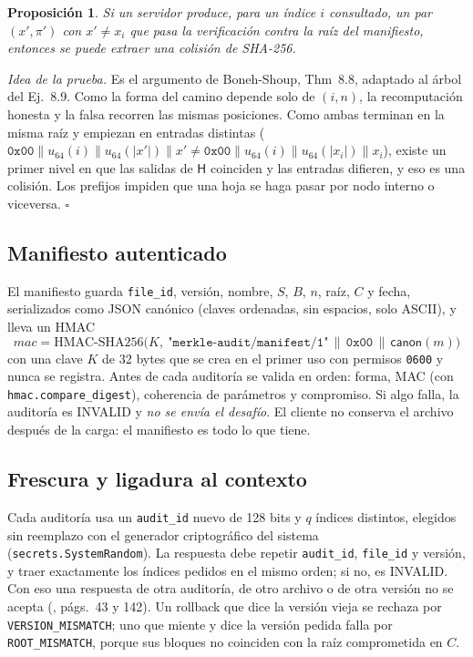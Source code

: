 \documentclass[11pt,a4paper]{article}
\newcommand{\code}[1]{\texttt{#1}}
\newcommand{\cause}[1]{\texttt{\small #1}}
\newcommand{\Hash}{\mathsf{H}}
\newtheorem{proposicion}{Proposición}
\begin{document}
\begin{proposicion}
Si un servidor produce, para un índice $i$ consultado, un par $(x',\pi')$ con $x'\ne x_i$ que pasa
la verificación contra la raíz del manifiesto, entonces se puede extraer una colisión de SHA-256.
\end{proposicion}
\noindent\emph{Idea de la prueba.} Es el argumento de Boneh-Shoup, Thm~8.8, adaptado al árbol del
Ej.~8.9. Como la forma del camino depende solo de $(i,n)$, la recomputación honesta y la falsa
recorren las mismas posiciones. Como ambas terminan en la misma raíz y empiezan en entradas
distintas ($\code{0x00}\|u_{64}(i)\|u_{64}(|x'|)\|x' \ne \code{0x00}\|u_{64}(i)\|u_{64}(|x_i|)\|x_i$),
existe un primer nivel en que las salidas de $\Hash$ coinciden y las entradas difieren, y eso es una
colisión. Los prefijos impiden que una hoja se haga pasar por nodo interno o viceversa. \hfill$\square$

\subsection{Manifiesto autenticado}
El manifiesto guarda \code{file\_id}, versión, nombre, $S$, $B$, $n$, raíz, $C$ y fecha, serializados
como JSON canónico (claves ordenadas, sin espacios, solo ASCII), y lleva un HMAC \cite{rfc2104}
\[
\mathit{mac}=\mathrm{HMAC\text{-}SHA256}\bigl(K,\ \texttt{"merkle-audit/manifest/1"}\,\|\,\code{0x00}\,\|\,\mathsf{canon}(m)\bigr)
\]
con una clave $K$ de 32 bytes que se crea en el primer uso con permisos \code{0600} y nunca se
registra. Antes de cada auditoría se valida en orden: forma, MAC (con
\code{hmac.compare\_digest}), coherencia de parámetros y compromiso. Si algo falla, la auditoría es
INVALID y \emph{no se envía el desafío}. El cliente no conserva el archivo después de la carga: el
manifiesto es todo lo que tiene.

\subsection{Frescura y ligadura al contexto}
Cada auditoría usa un \code{audit\_id} nuevo de 128 bits y $q$ índices distintos, elegidos sin
reemplazo con el generador criptográfico del sistema (\code{secrets.SystemRandom}). La respuesta debe repetir \code{audit\_id}, \code{file\_id} y
versión, y traer exactamente los índices pedidos en el mismo orden; si no, es INVALID. Con eso una
respuesta de otra auditoría, de otro archivo o de otra versión no se acepta
(\cite{vp}, págs.~43 y 142). Un rollback que dice la versión vieja se rechaza por
\cause{VERSION\_MISMATCH}; uno que miente y dice la versión pedida falla por \cause{ROOT\_MISMATCH},
porque sus bloques no coinciden con la raíz comprometida en $C$.
\end{document}
